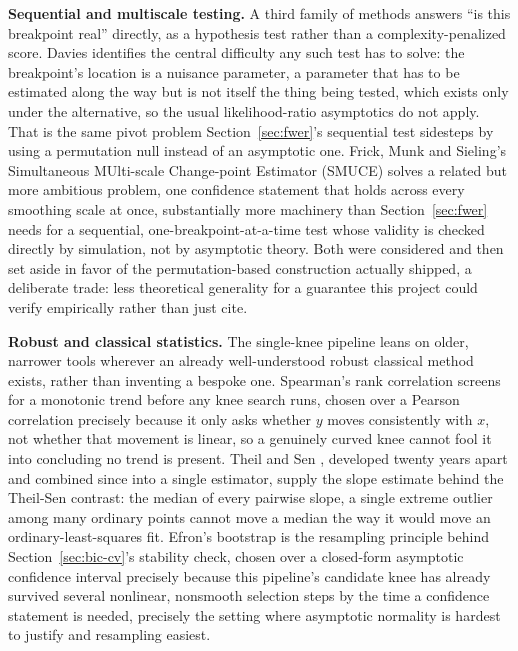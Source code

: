 \documentclass[11pt]{article}
\begin{document}
\textbf{Sequential and multiscale testing.} A third family of methods
answers ``is this breakpoint real'' directly, as a hypothesis test
rather than a complexity-penalized score. Davies \citep{davies1977}
identifies the central difficulty any such test has to solve: the
breakpoint's location is a nuisance parameter, a parameter that has to
be estimated along the way but is not itself the thing being tested,
which exists only under the alternative, so the usual likelihood-ratio
asymptotics do not apply. That is the same pivot problem
Section~\ref{sec:fwer}'s sequential test sidesteps by using a
permutation null instead of an asymptotic one. Frick, Munk
and Sieling's Simultaneous MUlti-scale Change-point Estimator (SMUCE)
\citep{frick2014} solves a related but more ambitious problem, one
confidence statement that holds across every smoothing scale at once,
substantially more machinery than Section~\ref{sec:fwer} needs for a
sequential, one-breakpoint-at-a-time test whose validity is checked
directly by simulation, not by asymptotic theory. Both were
considered and then set aside in favor of the permutation-based
construction actually shipped, a deliberate trade: less theoretical
generality for a guarantee this project could verify empirically rather
than just cite.

\textbf{Robust and classical statistics.} The single-knee pipeline
leans on older, narrower tools wherever an already well-understood
robust classical method exists, rather than inventing a bespoke one.
Spearman's rank correlation \citep{spearman1904} screens for a
monotonic trend before any knee search runs, chosen over a Pearson
correlation precisely because it only asks whether $y$ moves
consistently with $x$, not whether that movement is linear, so a
genuinely curved knee cannot fool it into concluding no trend is
present. Theil \citep{theil1950} and Sen \citep{sen1968}, developed
twenty years apart and combined since into a single estimator, supply
the slope estimate behind the Theil-Sen contrast: the median of every
pairwise slope, a single extreme outlier among many ordinary points
cannot move a median the way it would move an ordinary-least-squares
fit. Efron's bootstrap \citep{efron1979} is the resampling principle
behind Section~\ref{sec:bic-cv}'s stability check, chosen over a
closed-form asymptotic confidence interval precisely because this
pipeline's candidate knee has already survived several nonlinear,
nonsmooth selection steps by the time a confidence statement is needed,
precisely the setting where asymptotic normality is hardest to justify
and resampling easiest.
\end{document}
